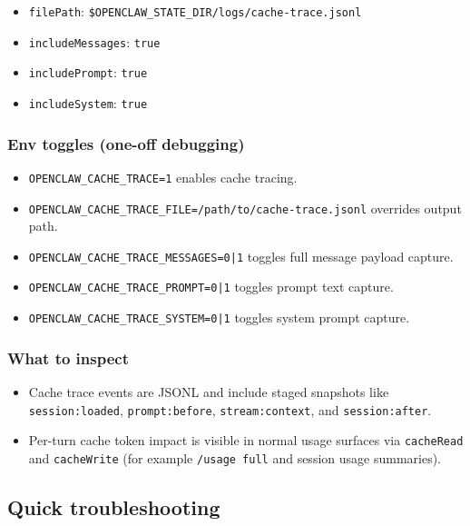 \begin{itemize}
  \item \texttt{filePath}: \texttt{\$OPENCLAW\_STATE\_DIR/logs/cache-trace.jsonl}
  \item \texttt{includeMessages}: \texttt{true}
  \item \texttt{includePrompt}: \texttt{true}
  \item \texttt{includeSystem}: \texttt{true}
\end{itemize}


\subsubsection{Env toggles (one-off debugging)}


\begin{itemize}
  \item \texttt{OPENCLAW\_CACHE\_TRACE=1} enables cache tracing.
  \item \texttt{OPENCLAW\_CACHE\_TRACE\_FILE=/path/to/cache-trace.jsonl} overrides output path.
  \item \texttt{OPENCLAW\_CACHE\_TRACE\_MESSAGES=0|1} toggles full message payload capture.
  \item \texttt{OPENCLAW\_CACHE\_TRACE\_PROMPT=0|1} toggles prompt text capture.
  \item \texttt{OPENCLAW\_CACHE\_TRACE\_SYSTEM=0|1} toggles system prompt capture.
\end{itemize}


\subsubsection{What to inspect}


\begin{itemize}
  \item Cache trace events are JSONL and include staged snapshots like \texttt{session:loaded}, \texttt{prompt:before}, \texttt{stream:context}, and \texttt{session:after}.
  \item Per-turn cache token impact is visible in normal usage surfaces via \texttt{cacheRead} and \texttt{cacheWrite} (for example \texttt{/usage full} and session usage summaries).
\end{itemize}


\subsection{Quick troubleshooting}



